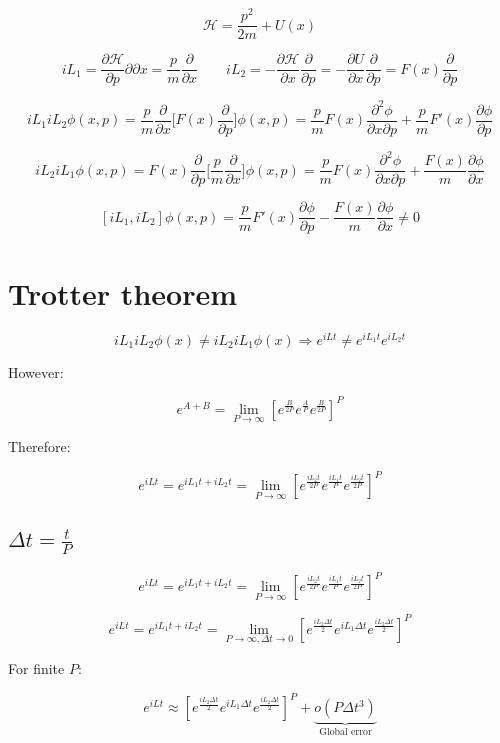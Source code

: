 	$$\mathcal{H} = \frac{p^2}{2m} + U(x)$$

	$$iL_1 = \frac{\partial\mathcal{H}}{\partial p}{\partial}{\partial x} = \frac{p}{m}\frac{\partial}{\partial x}\qquad iL_2 = -\frac{\partial\mathcal{H}}{\partial x}\frac{\partial}{\partial p} = -\frac{\partial U}{\partial x}\frac{\partial}{\partial p} = F(x)\frac{\partial}{\partial p}$$

	$$iL_1iL_2\phi(x, p) = \frac{p}{m}\frac{\partial}{\partial x}\biggl[F(x)\frac{\partial}{\partial p}\biggr]\phi(x, p) = \frac{p}{m}F(x)\frac{\partial^2\phi}{\partial x\partial p} + \frac{p}{m}F'(x)\frac{\partial\phi}{\partial p}$$

	$$iL_2iL_1\phi(x, p) = F(x)\frac{\partial}{\partial p}\biggl[\frac{p}{m}\frac{\partial}{\partial x}\biggr]\phi(x, p) = \frac{p}{m}F(x)\frac{\partial^2\phi}{\partial x\partial p} + \frac{F(x)}{m}\frac{\partial \phi}{\partial x}$$

	$$[iL_1, iL_2]\phi(x, p) = \frac{p}{m}F'(x)\frac{\partial \phi}{\partial p} -\frac{F(x)}{m}\frac{\partial \phi}{\partial x}\neq 0$$

\section{Trotter theorem}

$$iL_1iL_2\phi(x)\neq iL_2iL_1\phi(x)\Rightarrow e^{iLt}\neq e^{iL_1t}e^{iL_2t}$$

However:

$$e^{A+B} = \lim\limits_{P\rightarrow\infty}[e^{\frac{B}{2P}}e^{\frac{A}{P}}e^{\frac{B}{2P}}]^P$$

Therefore:

$$e^{iLt} = e^{iL_1t+iL_2t} = \lim\limits_{P\rightarrow\infty}[e^{\frac{iL_2t}{2P}}e^{\frac{iL_1t}{P}}e^{\frac{iL_2t}{2P}}]^P$$

	\subsection{$\Delta t = \frac{t}{P}$}

	$$e^{iLt} = e^{iL_1t+iL_2t} = \lim\limits_{P\rightarrow\infty}[e^{\frac{iL_2t}{2P}}e^{\frac{iL_1t}{P}}e^{\frac{iL_2t}{2P}}]^P$$

	$$e^{iLt} = e^{iL_1t+iL_2t} = \lim\limits_{P\rightarrow\infty, \Delta t\rightarrow 0}[e^{\frac{iL_2\Delta t}{2}}e^{iL_1\Delta t}e^{\frac{iL_2\Delta t}{2}}]^P$$

	For finite $P$:

	$$e^{iLt}\approx[e^{\frac{iL_2\Delta t}{2}}e^{iL_1\Delta t}e^{\frac{iL_2\Delta t}{2}}]^P + \underbrace{o(P\Delta t^3)}_{\text{Global error}}$$

